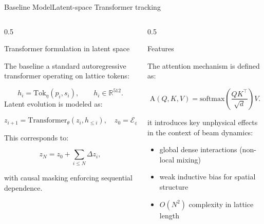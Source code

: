 \documentclass[aspectratio=169,t,11pt,table]{beamer}
{\setbeamercovered{transparent}}
\begin{document}
\begin{frame}{Baseline Model}{Latent-space Transformer tracking}

\vspace{-0.7cm}
\begin{columns}[T]
\begin{column}{0.5\textwidth}
\begin{purpleBlock}{\centering\small{Transformer formulation in latent space}}

\tiny

The baseline a standard autoregressive transformer operating on lattice tokens:

\begin{equation*}
    h_i = \mathrm{Tok}_\eta(p_i, s_i), \qquad h_i \in \mathbb{R}^{512}.
\end{equation*}
Latent evolution is modeled as:

\begin{equation*}
    z_{i+1} = \mathrm{Transformer}_\theta(z_i, h_{\le i}), \quad z_0 = \mathcal{E}_\phi(x,a,d).
\end{equation*}

This corresponds to:

\begin{equation*}
    z_N = z_0 + \sum_{i \le N} \Delta z_i,
\end{equation*}

with causal masking enforcing sequential dependence.

\end{purpleBlock}
\end{column}
\begin{column}{0.5\textwidth}
\begin{purpleBlock}{\centering\small{Features}}

\tiny

The attention mechanism is defined as:

\begin{equation*}
    \mathrm{A}(Q,K,V)=\mathrm{softmax}\left(\frac{QK^\top}{\sqrt{d}}\right)V.
\end{equation*}

it introduces key unphysical effects in the context of beam dynamics:
\begin{itemize}
\item global dense interactions (non-local mixing)
\item weak inductive bias for spatial structure
\item $O(N^2)$ complexity in lattice length
\end{itemize}

\end{purpleBlock}
\end{column}
\end{columns}

\end{frame}
\end{document}
